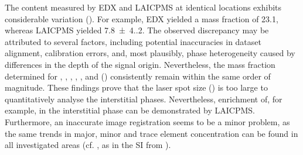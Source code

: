 The  content measured by \ac{EDX} and \ac{LAICPMS} at identical locations exhibits considerable variation ().
For example, \ac{EDX} yielded a mass fraction of \qty{23.1}{\wtpercent}, whereas \ac{LAICPMS} yielded \qty{7.8(4.2)}{\wtpercent}.
The observed discrepancy may be attributed to several factors, including potential inaccuracies in dataset alignment, calibration errors, and, most plausibly, phase heterogeneity caused by differences in the depth of the signal origin.
Nevertheless, the mass fraction determined for , , , , , and  () consistently remain within the same order of magnitude.
These findings prove that the laser spot size () is too large to quantitatively analyse the interstitial phases.
Nevertheless, enrichment of, for example,  in the interstitial phase can be demonstrated by \ac{LAICPMS}.
Furthermore, an inaccurate image registration seems to be a minor problem, as the same trends in major, minor and trace element concentration can be found in all investigated areas (cf. , as in the \ac{SI} from \cite{kleiner.2022b}).

